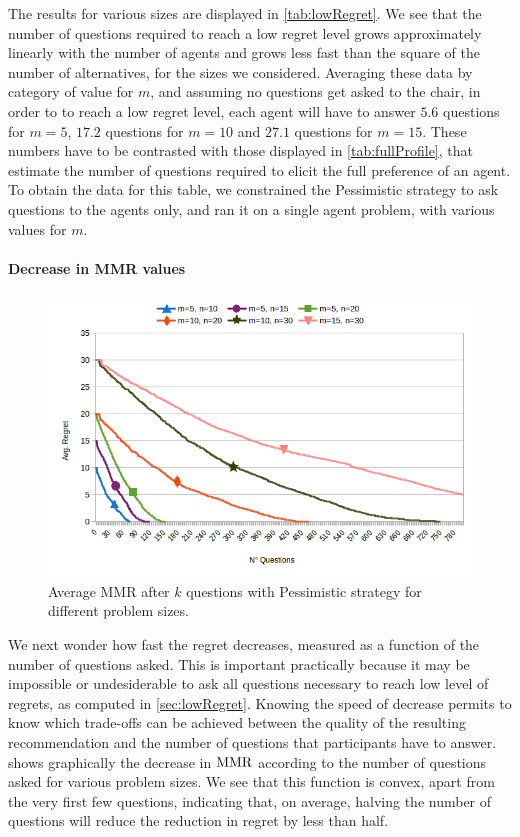 \documentclass[sigconf, anonymous]{aamas}
\begin{document}
The results for various sizes are displayed in \cref{tab:lowRegret}. 
We see that the number of questions required to reach a low regret level grows approximately linearly with the number of agents and grows less fast than the square of the number of alternatives, for the sizes we considered. Averaging these data by category of value for $m$, and assuming no questions get asked to the chair, in order to to reach a low regret level, each agent will have to answer $5.6$ questions for $m = 5$, $17.2$ questions for $m = 10$ and $27.1$ questions for $m = 15$. These numbers have to be contrasted with those displayed in \cref{tab:fullProfile}, that estimate the number of questions required to elicit the full preference of an agent. To obtain the data for this table, we constrained the Pessimistic strategy to ask questions to the agents only, and ran it on a single agent problem, with various values for $m$.

\paragraph{Decrease in MMR values}
\balance
\begin{figure}
	\caption{Average MMR after $k$ questions with Pessimistic strategy for different problem sizes.}
	\label{fig:linearity}
	\includegraphics[width=.45\textwidth]{linearity.png}
\end{figure}

We next wonder how fast the regret decreases, measured as a function of the number of questions asked. This is important practically because it may be impossible or undesiderable to ask all questions necessary to reach low level of regrets, as computed in \cref{sec:lowRegret}. Knowing the speed of decrease permits to know which trade-offs can be achieved between the quality of the resulting recommendation and the number of questions that participants have to answer.  shows graphically the decrease in $\operatorname{MMR}$ according to the number of questions asked for various problem sizes. We see that this function is convex, apart from the very first few questions, indicating %
that, on average, halving the number of questions will reduce the reduction in regret by less than half.%
\end{document}
